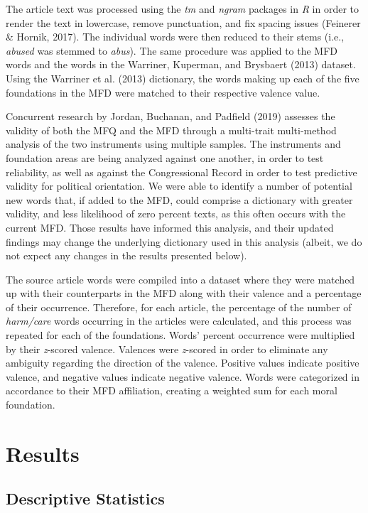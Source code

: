 \documentclass[
  english,
  man]{apa6}
\begin{document}
The article text was processed using the \emph{tm} and \emph{ngram} packages in \emph{R} in order to render the text in lowercase, remove punctuation, and fix spacing issues (Feinerer \& Hornik, 2017). The individual words were then reduced to their stems (i.e., \emph{abused} was stemmed to \emph{abus}). The same procedure was applied to the MFD words and the words in the Warriner, Kuperman, and Brysbaert (2013) dataset. Using the Warriner et al. (2013) dictionary, the words making up each of the five foundations in the MFD were matched to their respective valence value.

Concurrent research by Jordan, Buchanan, and Padfield (2019) assesses the validity of both the MFQ and the MFD through a multi-trait multi-method analysis of the two instruments using multiple samples. The instruments and foundation areas are being analyzed against one another, in order to test reliability, as well as against the Congressional Record in order to test predictive validity for political orientation. We were able to identify a number of potential new words that, if added to the MFD, could comprise a dictionary with greater validity, and less likelihood of zero percent texts, as this often occurs with the current MFD. Those results have informed this analysis, and their updated findings may change the underlying dictionary used in this analysis (albeit, we do not expect any changes in the results presented below).

The source article words were compiled into a dataset where they were matched up with their counterparts in the MFD along with their valence and a percentage of their occurrence. Therefore, for each article, the percentage of the number of \emph{harm/care} words occurring in the articles were calculated, and this process was repeated for each of the foundations. Words' percent occurrence were multiplied by their \emph{z}-scored valence. Valences were \emph{z}-scored in order to eliminate any ambiguity regarding the direction of the valence. Positive values indicate positive valence, and negative values indicate negative valence. Words were categorized in accordance to their MFD affiliation, creating a weighted sum for each moral foundation.

\hypertarget{results}{%
\section{Results}\label{results}}

\hypertarget{descriptive-statistics}{%
\subsection{Descriptive Statistics}\label{descriptive-statistics}}
\end{document}
